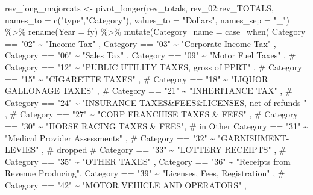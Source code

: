 \documentclass[
  letterpaper,
  DIV=11,
  numbers=noendperiod]{scrreport}
\newenvironment{Shaded}{\begin{snugshade}}{\end{snugshade}}
\newcommand{\AttributeTok}[1]{\textcolor[rgb]{0.40,0.45,0.13}{#1}}
\newcommand{\CommentTok}[1]{\textcolor[rgb]{0.37,0.37,0.37}{#1}}
\newcommand{\FunctionTok}[1]{\textcolor[rgb]{0.28,0.35,0.67}{#1}}
\newcommand{\NormalTok}[1]{\textcolor[rgb]{0.00,0.23,0.31}{#1}}
\newcommand{\OtherTok}[1]{\textcolor[rgb]{0.00,0.23,0.31}{#1}}
\newcommand{\SpecialCharTok}[1]{\textcolor[rgb]{0.37,0.37,0.37}{#1}}
\newcommand{\StringTok}[1]{\textcolor[rgb]{0.13,0.47,0.30}{#1}}
\begin{document}
\begin{Shaded}
\begin{Highlighting}[]
\NormalTok{rev\_long\_majorcats }\OtherTok{\textless{}{-}} \FunctionTok{pivot\_longer}\NormalTok{(rev\_totals, rev\_02}\SpecialCharTok{:}\NormalTok{rev\_TOTALS, }\AttributeTok{names\_to =} \FunctionTok{c}\NormalTok{(}\StringTok{"type"}\NormalTok{,}\StringTok{"Category"}\NormalTok{), }\AttributeTok{values\_to =} \StringTok{"Dollars"}\NormalTok{, }\AttributeTok{names\_sep =} \StringTok{"\_"}\NormalTok{) }\SpecialCharTok{\%\textgreater{}\%} 
  \FunctionTok{rename}\NormalTok{(}\AttributeTok{Year =}\NormalTok{ fy) }\SpecialCharTok{\%\textgreater{}\%}
  \FunctionTok{mutate}\NormalTok{(}\AttributeTok{Category\_name =} \FunctionTok{case\_when}\NormalTok{(}
\NormalTok{    Category }\SpecialCharTok{==} \StringTok{"02"} \SpecialCharTok{\textasciitilde{}} \StringTok{"Income Tax"}\NormalTok{ ,}
\NormalTok{    Category }\SpecialCharTok{==} \StringTok{"03"} \SpecialCharTok{\textasciitilde{}} \StringTok{"Corporate Income Tax"}\NormalTok{ ,}
\NormalTok{    Category }\SpecialCharTok{==} \StringTok{"06"} \SpecialCharTok{\textasciitilde{}} \StringTok{"Sales Tax"}\NormalTok{ ,}
\NormalTok{    Category }\SpecialCharTok{==} \StringTok{"09"} \SpecialCharTok{\textasciitilde{}} \StringTok{"Motor Fuel Taxes"}\NormalTok{ ,}
 \CommentTok{\#   Category == "12" \textasciitilde{} "PUBLIC UTILITY TAXES, gross of PPRT" ,}
  \CommentTok{\#  Category == "15" \textasciitilde{} "CIGARETTE TAXES" ,}
 \CommentTok{\#   Category == "18" \textasciitilde{} "LIQUOR GALLONAGE TAXES" ,}
 \CommentTok{\#  Category == "21" \textasciitilde{} "INHERITANCE TAX" ,}
  \CommentTok{\#  Category == "24" \textasciitilde{} "INSURANCE TAXES\&FEES\&LICENSES, net of refunds " ,}
   \CommentTok{\# Category == "27" \textasciitilde{} "CORP FRANCHISE TAXES \& FEES" ,}
 \CommentTok{\#   Category == "30" \textasciitilde{} "HORSE RACING TAXES \& FEES",  \# in Other}
\NormalTok{    Category }\SpecialCharTok{==} \StringTok{"31"} \SpecialCharTok{\textasciitilde{}} \StringTok{"Medical Provider Assessments"}\NormalTok{ ,}
  \CommentTok{\#  Category == "32" \textasciitilde{} "GARNISHMENT{-}LEVIES" , \# dropped}
  \CommentTok{\#  Category == "33" \textasciitilde{}  "LOTTERY RECEIPTS" ,}
   \CommentTok{\# Category == "35" \textasciitilde{}  "OTHER TAXES" ,}
\NormalTok{    Category }\SpecialCharTok{==} \StringTok{"36"} \SpecialCharTok{\textasciitilde{}}  \StringTok{"Receipts from Revenue Producing"}\NormalTok{, }
\NormalTok{    Category }\SpecialCharTok{==} \StringTok{"39"} \SpecialCharTok{\textasciitilde{}}  \StringTok{"Licenses, Fees, Registration"}\NormalTok{ ,}
   \CommentTok{\# Category == "42" \textasciitilde{}  "MOTOR VEHICLE AND OPERATORS" ,}

\end{Highlighting}
\end{Shaded}
\end{document}
